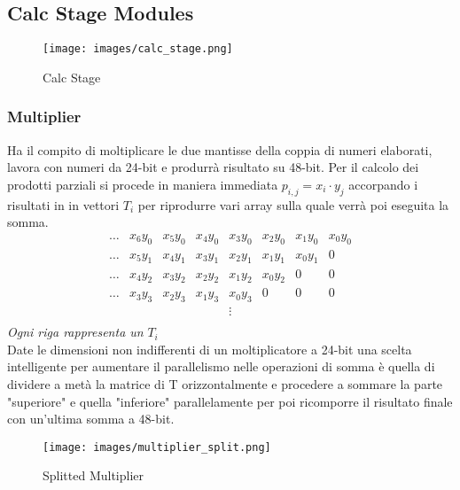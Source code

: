 \documentclass[twoside,11pt]{article}
\begin{document}
{\subsection{Calc Stage Modules}

\begin{figure}[h!]
    \centering
    \texttt{[image: images/calc\_stage.png]}
    \caption{Calc Stage}
    \label{fig:calc-stage}
\end{figure}

\subsubsection{Multiplier}
Ha il compito di moltiplicare le due mantisse della coppia di numeri elaborati, lavora con numeri da 24-bit e produrrà risultato su 48-bit.
Per il calcolo dei prodotti parziali si procede in maniera immediata $p_{i,j} = x_i \cdot y_j$ accorpando i risultati in in vettori $T_i$ per riprodurre vari array sulla quale verrà poi eseguita la somma.
\begin{equation*}
    \begin{matrix}
        \dots & x_6 y_0 & x_5 y_0 & x_4 y_0 & x_3 y_0 & x_2 y_0 & x_1 y_0 & x_0 y_0 \\
        \dots & x_5 y_1 & x_4 y_1 & x_3 y_1 & x_2 y_1 & x_1 y_1 & x_0 y_1 & 0       \\
        \dots & x_4 y_2 & x_3 y_2 & x_2 y_2 & x_1 y_2 & x_0 y_2 & 0       & 0       \\
        \dots & x_3 y_3 & x_2 y_3 & x_1 y_3 & x_0 y_3 & 0       & 0       & 0       \\
              &         &         &         & \vdots  &         &         &         \\
    \end{matrix}
\end{equation*}
\textit{Ogni riga rappresenta un} $T_i$\\

Date le dimensioni non indifferenti di un moltiplicatore a 24-bit una scelta intelligente per aumentare il parallelismo nelle operazioni di somma è quella di dividere a metà la matrice di T orizzontalmente e procedere a sommare la parte "superiore" e quella "inferiore" parallelamente per poi ricomporre il risultato finale con un'ultima somma a 48-bit.

\begin{figure}[h!]
    \centering
    \texttt{[image: images/multiplier\_split.png]}
    \caption{Splitted Multiplier}
    \label{fig:splitted-multiplier}
\end{figure}

}
\end{document}
